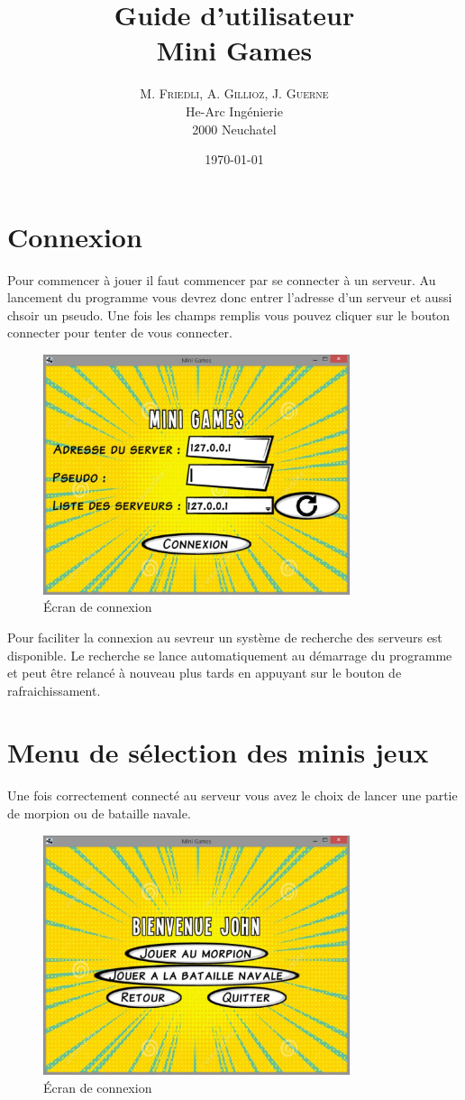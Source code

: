 \documentclass{report}
\title{\Huge Guide d'utilisateur \\ \huge Mini Games }
\author{M. \textsc{Friedli}, A. \textsc{Gillioz}, J. \textsc{Guerne}\\
He-Arc Ingénierie\\
2000 Neuchatel}
\date{\today{}}
\begin{document}
\maketitle

\chapter{Connexion}
Pour commencer à jouer il faut commencer par se connecter à un serveur.
Au lancement du programme vous devrez donc entrer l'adresse d'un serveur et aussi chsoir un pseudo. Une fois les champs remplis vous pouvez cliquer sur le bouton connecter pour tenter de vous connecter.

\begin{figure}[H]
	\centering\includegraphics[width=9cm]{loginScreen}
	\caption{Écran de connexion}
\end{figure}

Pour faciliter la connexion au sevreur un système de recherche des serveurs est disponible. Le recherche se lance
automatiquement au démarrage du programme et peut être relancé à nouveau plus tards en appuyant sur le bouton de rafraichissament.


\chapter{Menu de sélection des minis jeux}
Une fois correctement connecté au serveur vous avez le choix de lancer une partie de morpion ou de bataille navale.
\begin{figure}[H]
	\centering\includegraphics[width=9cm]{MenuJeux}
	\caption{Écran de connexion}
\end{figure}
\end{document}
